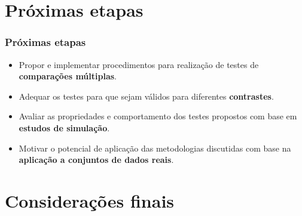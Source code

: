 \documentclass[10pt,
  aspectratio=169,
  serif,
  mathserif,
  professionalfont,
  compress,
  handout,
  ]{beamer}\usepackage[]{graphicx}\usepackage[]{color}
\begin{document}

\section{Próximas etapas}


\begin{frame}
  \frametitle{Próximas etapas}
 
\begin{itemize}
\itemsep 2ex

  \item Propor e implementar procedimentos para realização de testes de \textbf{comparações múltiplas}.
  
  \item Adequar os testes para que sejam válidos para diferentes \textbf{contrastes}. 
  
  \item Avaliar as propriedades e comportamento dos testes propostos com base em \textbf{estudos de simulação}.
  
  \item Motivar o potencial de aplicação das metodologias discutidas com base na \textbf{aplicação a conjuntos de dados reais}.
  
\end{itemize}

\end{frame}


\section{Considerações finais}

\end{document}
